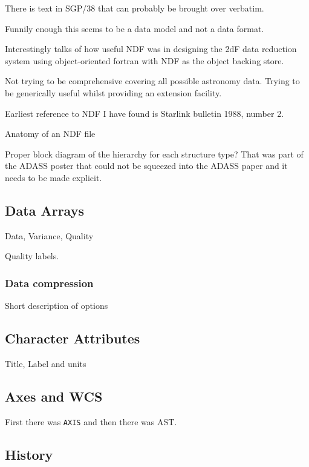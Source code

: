 \documentclass[final,authoryear,5p,times,twocolumn]{elsarticle}
\begin{document}
{There is text in SGP/38 that can probably be brought over verbatim.

Funnily enough this seems to be a data model and not a data format.

Interestingly \citet{1993ASPC...52..199B} talks of how useful NDF was in designing the
2dF data reduction system using object-oriented fortran with NDF as
the object backing store.

Not trying to be comprehensive covering all possible astronomy
data. Trying to be generically useful whilst providing an extension facility.

Earliest reference to NDF I have found is Starlink bulletin 1988,
number 2. \citep{1988STARB...2...11C}

Anatomy of an NDF file

Proper block diagram of the hierarchy for each structure type? That
was part of the ADASS poster that could not be squeezed into the ADASS
paper and it needs to be made explicit.

\subsection{Data Arrays}

Data, Variance, Quality

Quality labels.

\subsubsection{Data compression}

Short description of options \citep{2008ASPC..394..650C}

\subsection{Character Attributes}

Title, Label and units

\subsection{Axes and WCS}

First there was \texttt{AXIS} and then there was AST. \citep{1998ASPC..145...41W,2001ASPC..238..129B}

\subsection{History}

}
\end{document}
